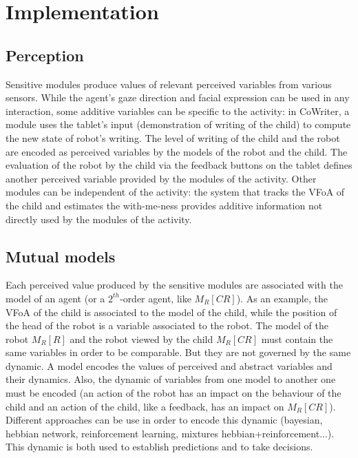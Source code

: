 \documentclass[10pt,a4paper]{article}
\begin{document}
\section{Implementation}\label{arch} 

\subsection{Perception}
\label{ssec:perception}
Sensitive modules produce values of relevant perceived variables from various sensors. 
While the agent's gaze direction and facial expression can be used in any interaction, some additive variables can be specific to the activity: in CoWriter, a module uses the tablet's input (demonstration of writing of the child) to compute the new state of robot's writing. The level of writing of the child and the robot are encoded as perceived variables by the models of the robot and the child.
The evaluation of the robot by the child via the feedback buttons on the tablet defines another perceived variable provided by the modules of the activity. 
Other modules can be independent of the activity: the system that tracks the VFoA of the child and estimates the with-me-ness provides additive information not directly used by the modules of the activity.  

\subsection{Mutual models}
\label{ssec:mmm}
Each perceived value produced by the sensitive modules are associated with the model of an agent (or a $2^{th}$-order agent, like $M_R\left[CR\right]$). As an example, the VFoA of the child is associated to the model of the child, while the position of the head of the robot is a variable associated to the robot.
The model of the robot $M_R\left[R\right]$ and the robot viewed by the child $M_R\left[CR\right]$ must contain the same variables in order to be comparable. But they are not governed by the same dynamic.
A model encodes the values of perceived and abstract variables and their dynamics. Also, the dynamic of variables from one model to another one must be encoded (an action of the robot has an impact on the behaviour of the child and an action of the child, like a feedback, has an impact on $M_R\left[CR\right]$). Different approaches can be use in order to encode this dynamic (bayesian, hebbian network, reinforcement learning, mixtures hebbian+reinforcement...). This dynamic is both used to establish predictions and to take decisions.
\end{document}
